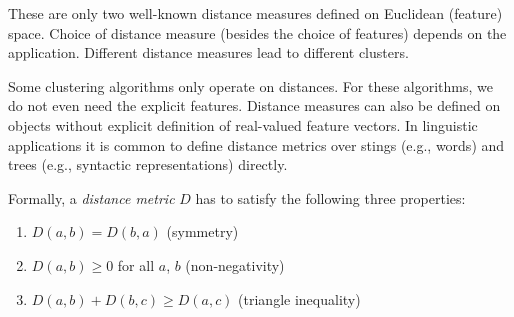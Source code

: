 These are only two well-known distance measures defined
on Euclidean (feature) space.
Choice of distance measure (besides the choice of features)
depends on the application.
Different distance measures lead to different clusters.

Some clustering algorithms only operate on distances.
For these algorithms, we do not even need the explicit features.
Distance measures can also be defined on objects
without explicit definition of real-valued feature vectors.
In linguistic applications it is common to define distance
metrics over stings (e.g., words) and trees 
(e.g., syntactic representations) directly.

Formally, a \emph{distance metric} $D$ has to satisfy
the following three properties:
\begin{enumerate}
  \item $D(a, b) = D(b, a)$ (symmetry) 
  \item $D(a, b) \ge 0$ for all $a$, $b$ (non-negativity)
  \item $D(a, b) + D(b, c) \ge D(a, c)$ (triangle inequality)
\end{enumerate}

